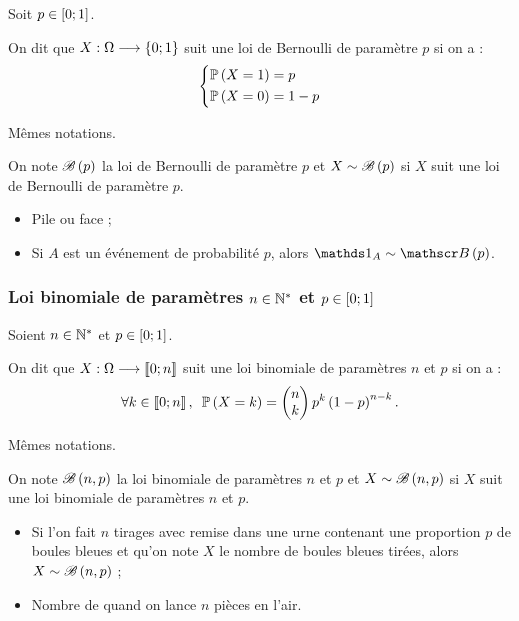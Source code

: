 \begin{defi}
Soit \(p\in\left[0;1\right]\).

On dit que \(X:\Omega\longrightarrow\left\lbrace0;1\right\rbrace\) suit une loi de Bernoulli de paramètre \(p\) si on a : \[\begin{dcases}
\mathbb{P}\left(X=1\right)=p \\
\mathbb{P}\left(X=0\right)=1-p
\end{dcases}\]
\end{defi}

\begin{nota}
Mêmes notations.

On note \(\mathscr{B}\left(p\right)\) la loi de Bernoulli de paramètre \(p\) et \(X\sim\mathscr{B}\left(p\right)\) si \(X\) suit une loi de Bernoulli de paramètre \(p\).
\end{nota}

\begin{ex}
\begin{itemize}
    \item Pile ou face ; \\
    \item Si \(A\) est un événement de probabilité \(p\), alors \(\ind{A}\sim\loibernoulli{p}\).
\end{itemize}
\end{ex}

\subsubsection{Loi binomiale de paramètres \(n\in\mathbb{N}^*\) et \(p\in\left[0;1\right]\)}

\begin{defi}
Soient \(n\in\mathbb{N}^*\) et \(p\in\left[0;1\right]\).

On dit que \(X:\Omega\longrightarrow\left\llbracket0;n\right\rrbracket\) suit une loi binomiale de paramètres \(n\) et \(p\) si on a : \[\quantifs{\forall k\in\interventierii{0}{n}}\proba{X=k}=\binom{k}{n}p^k\paren{1-p}^{n-k}.\]
\end{defi}

\begin{nota}
Mêmes notations.

On note \(\mathscr{B}\left(n,p\right)\) la loi binomiale de paramètres \(n\) et \(p\) et \(X\sim\mathscr{B}\left(n,p\right)\) si \(X\) suit une loi binomiale de paramètres \(n\) et \(p\).
\end{nota}

\begin{ex}
\begin{itemize}
    \item Si l'on fait \(n\) tirages avec remise dans une urne contenant une proportion \(p\) de boules bleues et qu'on note \(X\) le nombre de boules bleues tirées, alors \(X\sim\mathscr{B}\left(n,p\right)\) ; \\
    \item Nombre de  quand on lance \(n\) pièces en l'air.
\end{itemize}
\end{ex}

